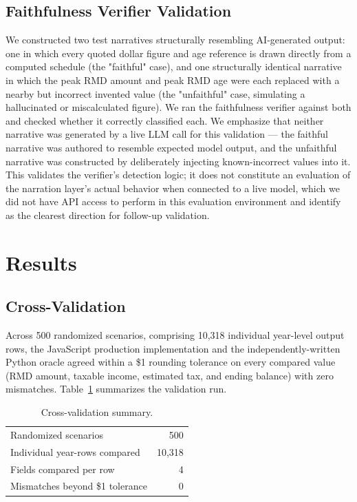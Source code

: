 \documentclass[11pt]{article}
\begin{document}
\subsection{Faithfulness Verifier Validation}

We constructed two test narratives structurally resembling AI-generated
output: one in which every quoted dollar figure and age reference is
drawn directly from a computed schedule (the "faithful" case), and one
structurally identical narrative in which the peak RMD amount and peak
RMD age were each replaced with a nearby but incorrect invented value
(the "unfaithful" case, simulating a hallucinated or miscalculated
figure). We ran the faithfulness verifier against both and checked
whether it correctly classified each. We emphasize that neither
narrative was generated by a live LLM call for this validation — the
faithful narrative was authored to resemble expected model output, and
the unfaithful narrative was constructed by deliberately injecting
known-incorrect values into it. This validates the verifier's detection
logic; it does not constitute an evaluation of the narration layer's
actual behavior when connected to a live model, which we did not have
API access to perform in this evaluation environment and identify as
the clearest direction for follow-up validation.

\section{Results}

\subsection{Cross-Validation}

Across 500 randomized scenarios, comprising 10,318 individual year-level
output rows, the JavaScript production implementation and the
independently-written Python oracle agreed within a \$1 rounding
tolerance on every compared value (RMD amount, taxable income, estimated
tax, and ending balance) with zero mismatches. Table~\ref{tab:crossval}
summarizes the validation run.

\begin{table}[h]
\centering\small
\caption{Cross-validation summary.}
\label{tab:crossval}
\begin{tabular}{lr}
\toprule
Randomized scenarios & 500 \\
Individual year-rows compared & 10,318 \\
Fields compared per row & 4 \\
Mismatches beyond \$1 tolerance & 0 \\
\bottomrule
\end{tabular}
\end{table}
\end{document}

